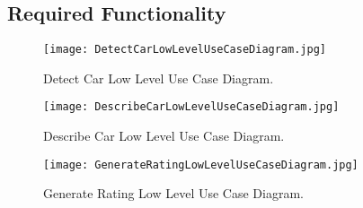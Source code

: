 \subsection{Required Functionality}
\begin{figure}[h!]
  \caption{Detect Car Low Level Use Case Diagram.}
  \centering
	\texttt{[image: DetectCarLowLevelUseCaseDiagram.jpg]}
\end{figure}

\begin{figure}[h!]
  \caption{Describe Car Low Level Use Case Diagram.}
  \centering
	\texttt{[image: DescribeCarLowLevelUseCaseDiagram.jpg]}
\end{figure}

\begin{figure}[h!]
  \caption{Generate Rating Low Level Use Case Diagram.}
  \centering
	\texttt{[image: GenerateRatingLowLevelUseCaseDiagram.jpg]}
\end{figure}

